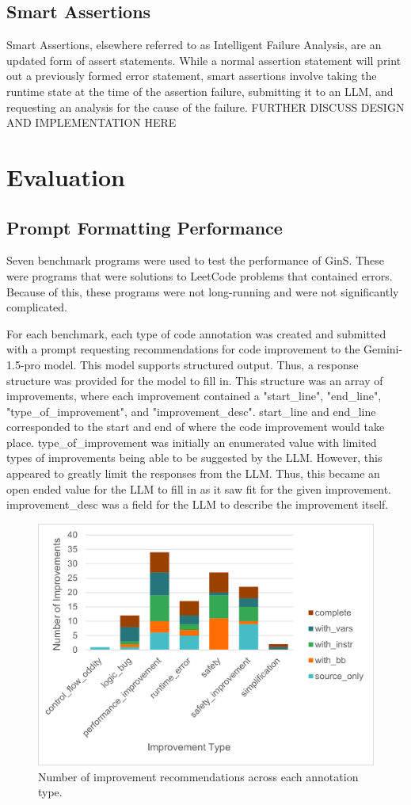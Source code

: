 \documentclass[sigconf]{acmart}
\begin{document}
\subsection{Smart Assertions}
Smart Assertions, elsewhere referred to as Intelligent Failure Analysis, are an updated form of assert statements.
While a normal assertion statement will print out a previously formed error statement, smart assertions involve taking the runtime state at the time of the assertion failure, submitting it to an LLM, and requesting an analysis for the cause of the failure.
FURTHER DISCUSS DESIGN AND IMPLEMENTATION HERE

\section{Evaluation}
\subsection{Prompt Formatting Performance}

Seven benchmark programs were used to test the performance of GinS.
These were programs that were solutions to LeetCode problems that contained errors.
Because of this, these programs were not long-running and were not significantly complicated.

For each benchmark, each type of code annotation was created and submitted with a prompt requesting recommendations for code improvement to the Gemini-1.5-pro model.
This model supports structured output.
Thus, a response structure was provided for the model to fill in.
This structure was an array of improvements, where each improvement contained a "start\_line", "end\_line", "type\_of\_improvement", and "improvement\_desc".
start\_line and end\_line corresponded to the start and end of where the code improvement would take place.
type\_of\_improvement was initially an enumerated value with limited types of improvements being able to be suggested by the LLM.
However, this appeared to greatly limit the responses from the LLM.
Thus, this became an open ended value for the LLM to fill in as it saw fit for the given improvement.
improvement\_desc was a field for the LLM to describe the improvement itself.

\begin{figure}
    \centering
    \includegraphics[width=0.8\linewidth]{images/PostFiltering.png}
    \caption{Number of improvement recommendations across each annotation type.}
    \label{fig:filtered}
\end{figure}
\end{document}
